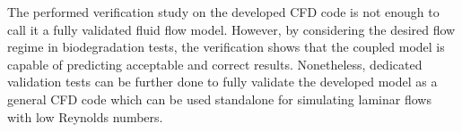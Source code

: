 The performed verification study on the developed CFD code is not enough to call it a fully validated fluid flow model. However, by considering the desired flow regime in biodegradation tests, the verification shows that the coupled model is capable of predicting acceptable and correct results. Nonetheless, dedicated validation tests can be further done to fully validate the developed model as a general CFD code which can be used standalone for simulating laminar flows with low Reynolds numbers.













\cleardoublepage
